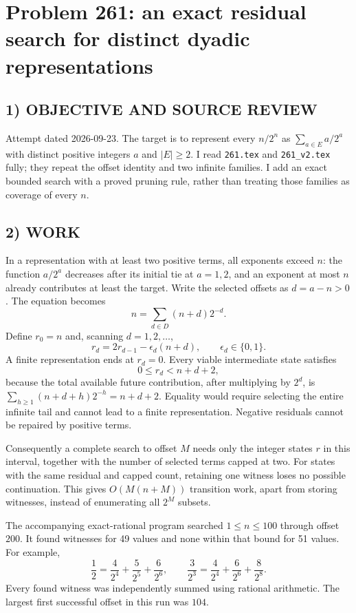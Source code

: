 \section{Problem 261: an exact residual search for distinct dyadic representations}
\subsection*{1) OBJECTIVE AND SOURCE REVIEW}
Attempt dated 2026-09-23. The target is to represent every $n/2^n$ as $\sum_{a\in E}a/2^a$ with distinct positive integers $a$ and $|E|\ge2$. I read \texttt{261.tex} and \texttt{261\_v2.tex} fully; they repeat the offset identity and two infinite families. I add an exact bounded search with a proved pruning rule, rather than treating those families as coverage of every $n$.
\subsection*{2) WORK}
In a representation with at least two positive terms, all exponents exceed $n$: the function $a/2^a$ decreases after its initial tie at $a=1,2$, and an exponent at most $n$ already contributes at least the target. Write the selected offsets as $d=a-n>0$. The equation becomes
\[
n=\sum_{d\in D}(n+d)2^{-d}.
\]
Define $r_0=n$ and, scanning $d=1,2,\ldots$,
\[
r_d=2r_{d-1}-\epsilon_d(n+d),\qquad\epsilon_d\in\{0,1\}.
\]
A finite representation ends at $r_d=0$. Every viable intermediate state satisfies
\[
0\le r_d<n+d+2,
\]
because the total available future contribution, after multiplying by $2^d$, is $\sum_{h\ge1}(n+d+h)2^{-h}=n+d+2$. Equality would require selecting the entire infinite tail and cannot lead to a finite representation. Negative residuals cannot be repaired by positive terms.

Consequently a complete search to offset $M$ needs only the integer states $r$ in this interval, together with the number of selected terms capped at two. For states with the same residual and capped count, retaining one witness loses no possible continuation. This gives $O(M(n+M))$ transition work, apart from storing witnesses, instead of enumerating all $2^M$ subsets.

The accompanying exact-rational program searched $1\le n\le100$ through offset $200$. It found witnesses for 49 values and none within that bound for 51 values. For example,
\[
\frac1{2}=\frac4{2^4}+\frac5{2^5}+\frac6{2^6},\qquad
\frac3{2^3}=\frac4{2^4}+\frac6{2^6}+\frac8{2^8}.
\]
Every found witness was independently summed using rational arithmetic. The largest first successful offset in this run was $104$.
